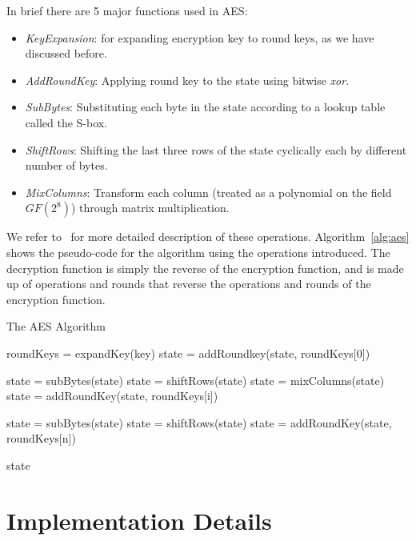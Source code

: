 \documentclass[a4paper, notitlepage]{report}
\begin{document}
In brief there are 5 major functions used in AES:
\begin{itemize}
\item \emph{KeyExpansion}: for expanding encryption key to round keys, as we have
  discussed before.
\item \emph{AddRoundKey}: Applying round key to the state using bitwise \emph{xor}.
\item \emph{SubBytes}: Substituting each byte in the state according to a lookup table
  called the S-box.
\item \emph{ShiftRows}: Shifting the last three rows of the state cyclically each by
  different number of bytes.
\item \emph{MixColumns}: Transform each column (treated as a polynomial on the field
  $GF(2^8)$) through matrix multiplication.
\end{itemize}

We refer to~\cite{standard2001announcing} for more detailed description of these
operations. Algorithm~\ref{alg:aes} shows the pseudo-code for the algorithm using
the operations
introduced.
The decryption function is simply the reverse of the encryption function, and
is made up of operations and rounds that reverse the operations and rounds of
the encryption function.

\begin{algorithm}
  \caption{The AES Algorithm}
  \label{alg:aes}
  \begin{algorithmic}[1]
    \State roundKeys = expandKey(key)
    \State 
    \State state = addRoundkey(state, roundKeys[0])

    \State state = subBytes(state)
    \State state = shiftRows(state)
    \State state = mixColumns(state)
    \State state = addRoundKey(state, roundKeys[i])
    \EndFor

    \State state = subBytes(state)
    \State state = shiftRows(state)
    \State state = addRoundKey(state, roundKeys[n])
    \State {}

    \State \Return state
    
  \end{algorithmic}
\end{algorithm}


\section{Implementation Details}
\end{document}
